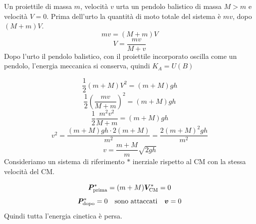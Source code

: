 \begin{Es}
Un proiettile di massa $m$, velocità $v$ urta un pendolo balistico di massa $M>m$ e velocità $V=0$. Prima dell'urto la quantità di moto totale del sistema è $mv$, dopo $(M+m)V$.
\begin{equation*}mv=(M+m)V\end{equation*}
\begin{equation*}V=\frac{mv}{M+v}\end{equation*}
Dopo l'urto il pendolo balistico, con il proiettile incorporato oscilla come un pendolo, l'energia meccanica si conserva, quindi $K_A=U(B)$


\begin{equation*}\frac{1}{2}(m+M)V^2=(m+M)gh\end{equation*}
\begin{equation*}\frac{1}{2}\left(\frac{mv}{M+m}\right)^2=(m+M)gh\end{equation*}
\begin{equation*}\frac{1}{2}\frac{m^2v^2}{M+m}=(m+M)gh\end{equation*}
\begin{equation*}v^2=\frac{(m+M)gh\cdot 2(m+M)}{m^2}=\frac{2(m+M)^2gh}{m^2}\end{equation*}
\begin{equation*}v=\frac{m+M}{m}\sqrt{2gh}\end{equation*}
Consideriamo un sistema di riferimento $\ast$ inerziale rispetto
al CM con la stessa velocità del CM.

\begin{equation*}\boldsymbol{P}^\ast_{\text{prima}}=(m+M)\boldsymbol{V}_{\text{CM}}^\ast=0\end{equation*}
\[\boldsymbol{P}^\ast_{\text{dopo}}=0\quad\text{sono attaccati}\quad \boldsymbol{v}=0\] Quindi tutta l'energia cinetica è persa.
\end{Es}
